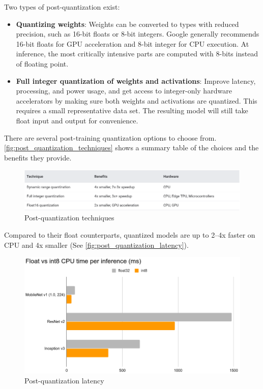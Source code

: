 Two types of post-quantization exist:
\begin{itemize}
    \item \textbf{Quantizing weights}: Weights can be converted to types with
        reduced precision, such as 16-bit floats or 8-bit integers. Google
        generally recommends 16-bit floats for GPU acceleration and 8-bit
        integer for CPU execution. At inference, the most critically intensive
        parts are computed with 8-bits instead of floating point.
    \item \textbf{Full integer quantization of weights and activations}:
        Improve latency, processing, and power usage, and get access to
        integer-only hardware accelerators by making sure both weights and
        activations are quantized.  This requires a small representative data
        set. The resulting model will still take float input and output for
        convenience.
\end{itemize}

There are several post-training quantization options to choose from.
\autoref{fig:post_quantization_techniques} shows a summary table of the choices
and the benefits they provide.~\cite{tfmot:quantization_post_training}

\begin{figure}[ht]
    \includegraphics[width=\textwidth]{images/introduction/post_quantization_techniques.png}
    \centering
    \caption{Post-quantization techniques}\label{fig:post_quantization_techniques}
\end{figure}

Compared to their float counterparts, quantized models are up to 2–4x faster on
CPU and 4x smaller (See \autoref{fig:post_quantization_latency}).

\begin{figure}[ht]
    \includegraphics[width=\textwidth]{images/introduction/post_quantization_latency.png}
    \centering
    \caption{Post-quantization latency}\label{fig:post_quantization_latency}
\end{figure}

